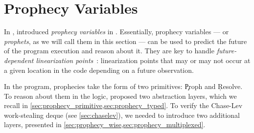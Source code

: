 

\section{Prophecy Variables}
\label{sec:prophecy}

In \citeyear{DBLP:journals/pacmpl/JungLPRTDJ20}, \citeauthor{DBLP:journals/pacmpl/JungLPRTDJ20} introduced \emph{prophecy variables} in \Iris.
Essentially, prophecy variables --- or \emph{prophets}, as we will call them in this section --- can be used to predict the future of the program execution and reason about it.
They are key to handle \emph{future-dependent linearization points}~\citep{DBLP:journals/corr/DongolD14}: linearization points that may or may not occur at a given location in the code depending on a future observation.

In the program, prophecies take the form of two primitives: \c{Proph} and \c{Resolve}.
To reason about them in the logic, \citet{DBLP:journals/pacmpl/JungLPRTDJ20} proposed two abstraction layers, which we recall in \cref{sec:prophecy_primitive,sec:prophecy_typed}.
To verify the Chase-Lev work-stealing deque (see \cref{sec:chaselev}), we needed to introduce two additional layers, presented in \cref{sec:prophecy_wise,sec:prophecy_multiplexed}.








